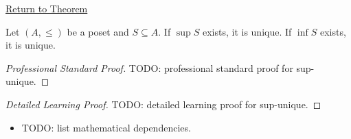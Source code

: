 \newpage
{}
\label{prf:sup-unique}

\begin{remark*}[Return]
\hyperref[prop:sup-unique]{Return to Theorem}
\end{remark*}

\begin{theorem*}
Let $(A, \leq)$ be a poset and $S \subseteq A$.  If $\sup S$ exists, it is
unique.  If $\inf S$ exists, it is unique.
\end{theorem*}

\begin{proof}[Professional Standard Proof]
\LRAProofBodyStart
TODO: professional standard proof for sup-unique.
\end{proof}

\begin{proof}[Detailed Learning Proof]
\LRAProofBodyStart
TODO: detailed learning proof for sup-unique.
\end{proof}

\begin{remark*}
\end{remark*}

\begin{dependencies}
\begin{itemize}
  \item TODO: list mathematical dependencies.
\end{itemize}
\end{dependencies}

\clearpage
